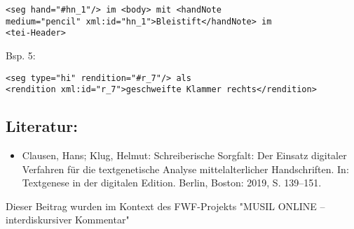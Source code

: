 \documentclass{article}
\begin{document}
        \begin{verbatim}<seg hand="#hn_1"/> im <body> mit <handNote
medium="pencil" xml:id="hn_1">Bleistift</handNote> im
<tei-Header>\end{verbatim}Bsp. 5:\\
            
        \begin{verbatim}<seg type="hi" rendition="#r_7"/> als 
<rendition xml:id="r_7">geschweifte Klammer rechts</rendition>\end{verbatim}\subsection*{Literatur:}\begin{itemize}\item Clausen, Hans; Klug, Helmut: Schreiberische Sorgfalt: Der Einsatz digitaler Verfahren
                              für die textgenetische Analyse mittelalterlicher Handschriften. In: Textgenese in der digitalen Edition. Berlin, Boston: 2019, S. 139–151.\end{itemize}Dieser Beitrag wurden im Kontext des FWF-Projekts "MUSIL ONLINE – interdiskursiver Kommentar" 
\end{document}
